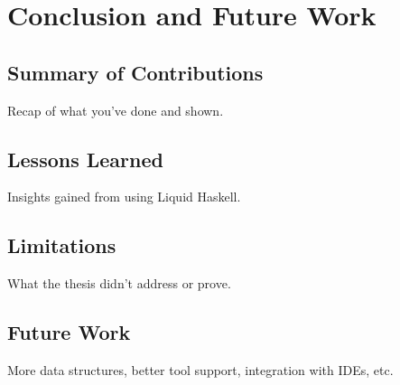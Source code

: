 \chapter { Conclusion and Future Work }
\section { Summary of Contributions }
Recap of what you’ve done and shown.

\section { Lessons Learned }
Insights gained from using Liquid Haskell.

\section { Limitations }
What the thesis didn’t address or prove.

\section { Future Work }
More data structures, better tool support, integration with IDEs, etc.

